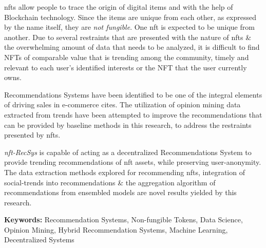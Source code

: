 
\gls{nft}s allow people to trace the origin of digital items and with the help of Blockchain technology. Since the items are unique from each other, as expressed by the name itself, they are \textit{not fungible}. One \gls{nft} is expected to be unique from another. 
Due to several restraints that are presented with the nature of \gls{nft}s \& the overwhelming amount of data that needs to be analyzed, it is difficult to find NFTs of comparable value that is trending among the community, timely and relevant to each user’s identified interests or the NFT that the user currently owns.

Recommendations Systems have been identified to be one of the integral elements of driving sales in e-commerce cites. The utilization of opinion mining data extracted from trends have been attempted to improve the recommendations that can be provided by baseline methods in this research, to address the restraints presented by \gls{nft}s.

\textit{\gls{nft}-RecSys} is capable of acting as a decentralized Recommendations System to provide trending recommendations of \gls{nft} assets, while preserving user-anonymity. The data extraction methods explored for recommending \gls{nft}s, integration of social-trends into recommendations \& the aggregation algorithm of recommendations from ensembled models are novel results yielded by this research.

\bigbreak
\textbf{Keywords:} Recommendation Systems, Non-fungible Tokens, Data Science, Opinion Mining, Hybrid Recommendation Systems, Machine Learning, Decentralized Systems